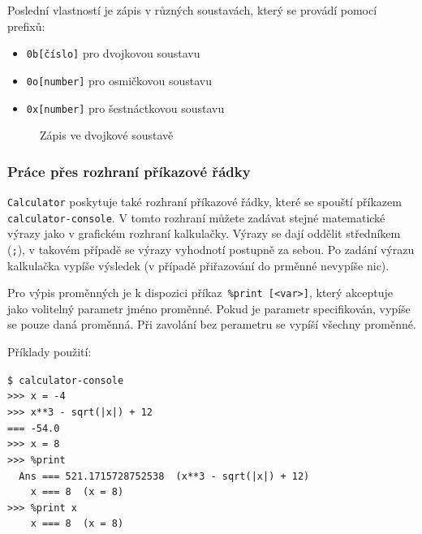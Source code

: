 \documentclass[a4paper, 11pt]{article}
\begin{document}
\noindent
Poslední vlastností je zápis v různých soustavách, který se provádí pomocí
prefixů:
\begin{itemize}
    \item \texttt{0b{[}číslo{]}} pro dvojkovou soustavu 
    \item \texttt{0o{[}number{]}} pro osmičkovou soustavu 
    \item \texttt{0x{[}number{]}} pro šestnáctkovou soustavu
\end{itemize}

\begin{figure}[H]
    \centering
    \caption{Zápis ve dvojkové soustavě}
\end{figure}

\subsubsection{Práce přes rozhraní příkazové řádky}
\texttt{Calculator} poskytuje také rozhraní příkazové řádky, které se spouští příkazem\texttt{ calculator-console}.
V tomto rozhraní můžete zadávat stejné matematické výrazy jako v grafickém rozhraní kalkulačky. Výrazy se dají oddělit středníkem (\texttt{;}), v takovém případě se výrazy vyhodnotí postupně za sebou. Po zadání výrazu kalkulačka vypíše výsledek (v případě přiřazování do prměnné nevypíše nic). 

Pro výpis proměnných je k dispozici příkaz\texttt{ \%print [<var>]}, který akceptuje jako volitelný parametr jméno proměnné. Pokud je parametr specifikován, vypíše se pouze daná proměnná. Při zavolání bez perametru se vypíší všechny proměnné.
\vspace{0.5cm}

\noindent
Příklady použití:

\noindent\texttt{\$ calculator-console} \\
\texttt{>>> x = -4} \\
\texttt{>>> x**3 - sqrt(|x|) + 12} \\
\texttt{=== -54.0} \\[0.5cm]
\texttt{>>> x = 8} \\
\texttt{>>> \%print} \\
\texttt{\-\ \ Ans === 521.1715728752538 \ (x**3 - sqrt(|x|) + 12)} \\
\texttt{\-\ \ \ \ x === 8 \ (x = 8)} \\[0.5cm]
\texttt{>>> \%print x} \\
\texttt{\-\ \ \ \ x === 8 \ (x = 8)} \\[0.5cm]
\end{document}
